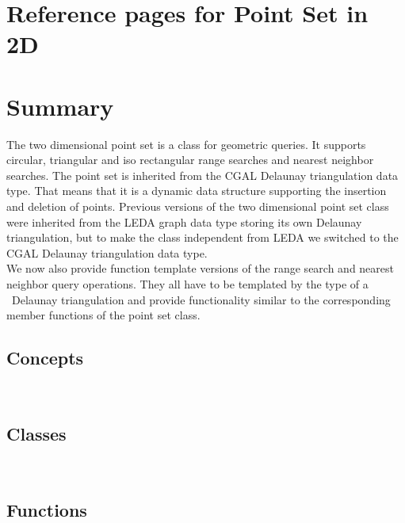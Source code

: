 

\ccParDims

\clearpage
\section{Reference pages for Point Set in 2D}

\section*{Summary}

The two dimensional point set is a class for geometric queries.
It supports circular, triangular and iso rectangular range searches and
nearest neighbor searches.
The point set is inherited from the CGAL Delaunay triangulation data type.
That means that it is a dynamic data structure supporting the insertion and
deletion of points. Previous versions of the two dimensional point set class
were inherited from the LEDA graph data type storing its own Delaunay triangulation,
but to make the class independent from LEDA we switched to the 
CGAL Delaunay triangulation data type. \\
We now also provide function template versions of the range search and nearest
neighbor query operations. They all have to be templated by the type of a \cgal\
Delaunay triangulation and provide functionality similar to the corresponding
member functions of the point set class.

\subsection*{Concepts}
\\

\subsection*{Classes}
\\

\subsection*{Functions}
\\
\\
\\
